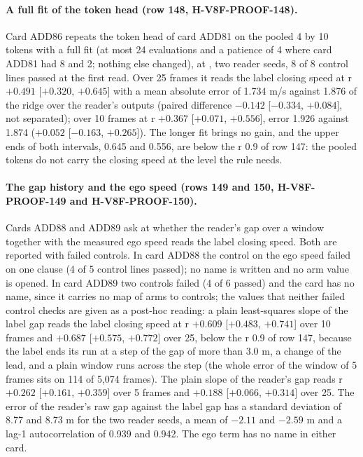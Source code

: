 \paragraph{A full fit of the token head (row 148, H-V8F-PROOF-148).} Card ADD86 repeats the token head of card ADD81 on the pooled 4 by 10 tokens with a full fit (at most 24 evaluations and a patience of 4 where card ADD81 had 8 and 2; nothing else changed), at , two reader seeds, 8 of 8 control lines passed at the first read. Over 25 frames it reads the label closing speed at r $+0.491$ [$+0.320$, $+0.645$] with a mean absolute error of 1.734 m/s against 1.876 of the ridge over the reader's outputs (paired difference $-0.142$ [$-0.334$, $+0.084$], not separated); over 10 frames at r $+0.367$ [$+0.071$, $+0.556$], error 1.926 against 1.874 ($+0.052$ [$-0.163$, $+0.265$]). The longer fit brings no gain, and the upper ends of both intervals, 0.645 and 0.556, are below the r 0.9 of row 147: the pooled tokens do not carry the closing speed at the level the rule needs.

\paragraph{The gap history and the ego speed (rows 149 and 150, H-V8F-PROOF-149 and H-V8F-PROOF-150).} Cards ADD88 and ADD89 ask at  whether the reader's gap over a window together with the measured ego speed reads the label closing speed. Both are reported with failed controls. In card ADD88 the control on the ego speed failed on one clause (4 of 5 control lines passed); no name is written and no arm value is opened. In card ADD89 two controls failed (4 of 6 passed) and the card has no name, since it carries no map of arms to controls; the values that neither failed control checks are given as a post-hoc reading: a plain least-squares slope of the label gap reads the label closing speed at r $+0.609$ [$+0.483$, $+0.741$] over 10 frames and $+0.687$ [$+0.575$, $+0.772$] over 25, below the r 0.9 of row 147, because the label ends its run at a step of the gap of more than 3.0 m, a change of the lead, and a plain window runs across the step (the whole error of the window of 5 frames sits on 114 of 5,074 frames). The plain slope of the reader's gap reads r $+0.262$ [$+0.161$, $+0.359$] over 5 frames and $+0.188$ [$+0.066$, $+0.314$] over 25. The error of the reader's raw gap against the label gap has a standard deviation of 8.77 and 8.73 m for the two reader seeds, a mean of $-2.11$ and $-2.59$ m and a lag-1 autocorrelation of 0.939 and 0.942. The ego term has no name in either card.

